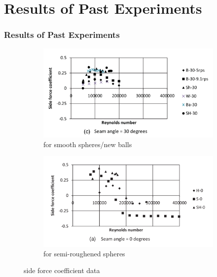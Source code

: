 \documentclass{beamer}
\begin{document}
\section{Results of Past Experiments}
\begin{frame}
\frametitle{Results of Past Experiments}

\begin{figure}[h!]
  \centering
  \begin{subfigure}[b]{0.5\linewidth}
    \includegraphics[width=\linewidth]{./figs/my_6.png}
    \caption{for
smooth spheres/new balls}
  \end{subfigure}
  \begin{subfigure}[b]{0.5\linewidth}
    \includegraphics[width=\linewidth]{./figs/my_7.png}
    \caption{for semi-roughened spheres}
  \end{subfigure}
  \caption{side force coefficient data }
  \label{fig:side2}
\end{figure}
\end{frame}
\end{document}
